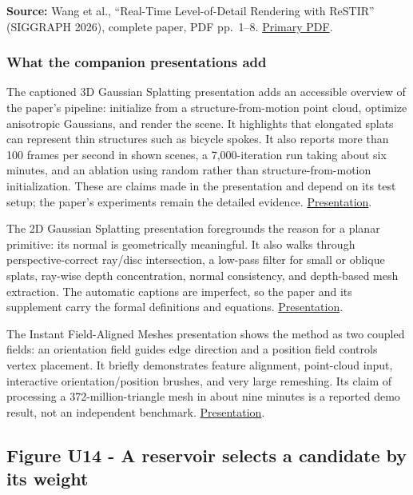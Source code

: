 \textbf{Source:} Wang et al., ``Real-Time Level-of-Detail Rendering with ReSTIR'' (SIGGRAPH 2026), complete paper, PDF pp.~1--8. \href{https://research.nvidia.com/labs/rtr/publication/wang2026levelOfDetail/wang2026levelOfDetail.pdf}{Primary PDF}.

\subsubsection{What the companion presentations add}\label{03-visual-computing-i-ch012-what-the-companion-presentations-add}

The captioned 3D Gaussian Splatting presentation adds an accessible overview of the paper's pipeline: initialize from a structure-from-motion point cloud, optimize anisotropic Gaussians, and render the scene. It highlights that elongated splats can represent thin structures such as bicycle spokes. It also reports more than 100 frames per second in shown scenes, a 7,000-iteration run taking about six minutes, and an ablation using random rather than structure-from-motion initialization. These are claims made in the presentation and depend on its test setup; the paper's experiments remain the detailed evidence. \href{https://www.youtube.com/watch?v=T_kXY43VZnk}{Presentation}.

The 2D Gaussian Splatting presentation foregrounds the reason for a planar primitive: its normal is geometrically meaningful. It also walks through perspective-correct ray/disc intersection, a low-pass filter for small or oblique splats, ray-wise depth concentration, normal consistency, and depth-based mesh extraction. The automatic captions are imperfect, so the paper and its supplement carry the formal definitions and equations. \href{https://www.youtube.com/watch?v=oaHCtB6yiKU}{Presentation}.

The Instant Field-Aligned Meshes presentation shows the method as two coupled fields: an orientation field guides edge direction and a position field controls vertex placement. It briefly demonstrates feature alignment, point-cloud input, interactive orientation/position brushes, and very large remeshing. Its claim of processing a 372-million-triangle mesh in about nine minutes is a reported demo result, not an independent benchmark. \href{https://www.youtube.com/watch?v=U6wtw6W4x3I}{Presentation}.

\subsection{Figure U14 - A reservoir selects a candidate by its weight}\label{03-visual-computing-i-ch012-figure-u14---a-reservoir-selects-a-candidate-by-its-weight}

